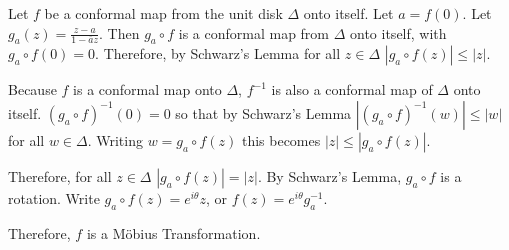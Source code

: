 \documentclass[12pt]{article}
\begin{document}
Let $f$ be a conformal map from the unit disk $\Delta$ onto itself. 
Let $a=f(0)$. Let $g_a(z) = \frac{z-a}{1-\overline{a}z}$. 
Then $g_a \circ f$ is a conformal map from $\Delta$ onto itself, 
with $g_a \circ f(0)=0$. 
Therefore, by Schwarz's Lemma for all $z \in \Delta$ $|g_a \circ f(z)| \le |z|$. 

Because $f$ is a conformal map onto $\Delta$, 
$f^{-1}$ is also a conformal map of $\Delta$ onto itself. 
$(g_a \circ f)^{-1}(0)=0$ so that by Schwarz's Lemma
$|(g_a \circ f)^{-1}(w)| \le |w|$ for all $w \in \Delta$. 
Writing $w=g_a \circ f(z)$ this becomes $|z| \le |g_a \circ f(z)|$. 

Therefore, for all $z \in \Delta$ $|g_a \circ f(z)| = |z|$. 
By Schwarz's Lemma, $g_a \circ f$ is a rotation. 
Write $g_a \circ f(z) = e^{i \theta} z$, or $f(z) = e^{i \theta} g_a^{-1}$. 

Therefore, $f$ is a M\"obius Transformation.
\end{document}
